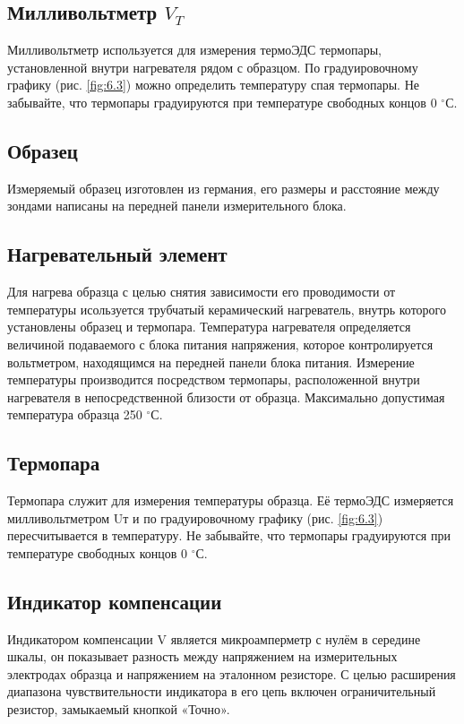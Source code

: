 \subsection{Милливольтметр $V_T$}
Милливольтметр используется для измерения термоЭДС термопары, установленной внутри нагревателя рядом с образцом. По
градуировочному графику (рис. \ref{fig:6.3}) можно определить температуру спая термопары. Не забывайте, что термопары градуируются
при температуре свободных концов 0 $^{\circ} $С.

\subsection{Образец}
Измеряемый образец изготовлен из германия, его размеры и расстояние между зондами написаны на передней панели измерительного блока.

\subsection{Нагревательный элемент}
Для нагрева образца с целью снятия зависимости его проводимости от температуры исользуется трубчатый керамический
нагреватель, внутрь которого установлены образец и термопара. Температура нагревателя определяется величиной подаваемого
с блока питания напряжения, которое контролируется вольтметром, находящимся на передней панели блока питания. Измерение
температуры производится посредством термопары, расположенной внутри нагревателя в непосредственной близости от образца.
Максимально допустимая температура образца 250 $^{\circ}$С.

\subsection{Термопара}
Термопара служит для измерения температуры образца. Её термоЭДС измеряется милливольтметром Uт и по градуировочному
графику (рис. \ref{fig:6.3}) пересчитывается в температуру. Не забывайте, что термопары градуируются при температуре свободных
концов 0 $^{\circ}$С.

\subsection{Индикатор компенсации}
Индикатором компенсации V является микроамперметр с нулём в середине шкалы, он показывает разность между напряжением на
измерительных электродах образца и напряжением на эталонном резисторе. С целью расширения диапазона чувствительности
индикатора в его цепь включен ограничительный резистор, замыкаемый кнопкой «Точно».

